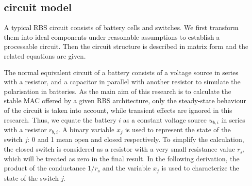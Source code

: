 \documentclass{article}
\begin{document}

\subsection{circuit model}

A typical RBS circuit consists of battery cells and switches.
We first transform them into ideal components under reasonable assumptions to establish a processable circuit.
Then the circuit structure is described in matrix form and the related equations are given.


The normal equivalent circuit of a battery consists of a voltage source in series with a resistor, and a capacitor in parallel with another resistor to simulate the polarisation in batteries.
As the main aim of this research is to calculate the stable MAC offered by a given RBS architecture, only the steady-state behaviour of the circuit is taken into account, while transient effects are ignored in this research.
Thus, we equate the battery $i$ as a constant voltage source $u_{b,i}$ in series with a resistor $r_{b,i}$.
A binary variable $x_j$ is used to represent the state of the switch $j$: 0 and 1 mean open and closed respectively.
To simplify the calculation, the closed switch is considered as a resistor with a very small resistance value $r_s$, which will be treated as zero in the final result.
In the following derivation, the product of the conductance $1/r_s$ and the variable $x_j$ is used to characterize the state of the switch $j$.
\end{document}
